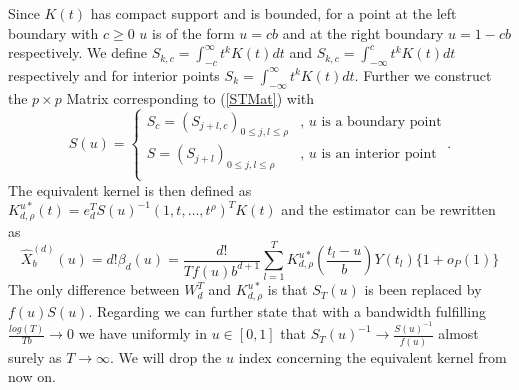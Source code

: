 Since $K(t)$ has compact support and is bounded, for a point at the left boundary with $c\geq 0$ $u$ is of the form $u=cb$ and at the right boundary $u=1-cb$ respectively. We define $S_{k,c}=\int_{-c}^\infty t^k K(t) dt$ and $S_{k,c}=\int_{-\infty}^c t^k K(t) dt$ respectively and for interior points $S_{k}=\int_{-\infty}^\infty t^k K(t) dt$. Further we construct the $p \times p$ Matrix corresponding to (\ref{STMat}) with
\begin{equation}
   S(u)=
   \begin{cases}
     S_c=(S_{j+l,c})_{0\leq j,l \leq\rho} 	&\text{, $u$ is a boundary point} \\
     S=(S_{j+l})_{0\leq j,l \leq\rho} 	&\text{, $u$ is an interior point}\\
   \end{cases} .
\end{equation}
 The equivalent kernel is then defined as $K_{d,\rho}^{u*}\left( t \right)  = e_d^T S(u)^{-1}(1,t,\dots, t^\rho)^T  K(t)$ and the estimator can be rewritten as 
\begin{equation}\label{polyeqkernn}
\hat{X}^{(d)}_{b}(u)= d! \beta_{d}(u) = \frac{d!}{T f(u) b^{d+1}} \sum_{l=1}^{T} K^{u*}_{d,\rho}\left( \frac{ t_{l}-u }{b}    \right) Y(t_{l})\{ 1+ o_P(1) \}
\end{equation}
The only difference between $W^T_d$ and $K^{u*}_{d,\rho}$ is that $S_T(u)$ is been replaced by $f(u)S(u)$. Regarding \cite{Masry96} we can further state that with a bandwidth fulfilling $\frac{log(T)}{T b} \rightarrow 0$ we have 
uniformly in $u \in [0,1]$ that $S_T(u)^{-1} \rightarrow \frac{S(u)^{-1}}{f(u)}$ almost surely as $T \rightarrow \infty$. We will drop the $u$ index concerning the equivalent kernel from now on.

